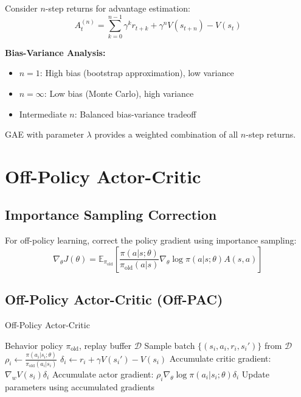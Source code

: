 \begin{examplebox}
Consider $n$-step returns for advantage estimation:
\begin{equation}
A_t^{(n)} = \sum_{k=0}^{n-1} \gamma^k r_{t+k} + \gamma^n V(s_{t+n}) - V(s_t)
\end{equation}

\textbf{Bias-Variance Analysis:}
\begin{itemize}
    \item $n = 1$: High bias (bootstrap approximation), low variance
    \item $n = \infty$: Low bias (Monte Carlo), high variance  
    \item Intermediate $n$: Balanced bias-variance tradeoff
\end{itemize}

GAE with parameter $\lambda$ provides a weighted combination of all $n$-step returns.
\end{examplebox}

\section{Off-Policy Actor-Critic}

\subsection{Importance Sampling Correction}

For off-policy learning, correct the policy gradient using importance sampling:
\begin{equation}
\nabla_\theta J(\theta) = \mathbb{E}_{\pi_{\text{old}}} \left[ \frac{\pi(a|s; \theta)}{\pi_{\text{old}}(a|s)} \nabla_\theta \log \pi(a|s; \theta) A(s,a) \right]
\end{equation}

\subsection{Off-Policy Actor-Critic (Off-PAC)}

\begin{algorithm}
\caption{Off-Policy Actor-Critic}
\begin{algorithmic}
\REQUIRE Behavior policy $\pi_{\text{old}}$, replay buffer $\mathcal{D}$
    \STATE Sample batch $\{(s_i, a_i, r_i, s_i')\}$ from $\mathcal{D}$
        \STATE $\rho_i \leftarrow \frac{\pi(a_i|s_i; \theta)}{\pi_{\text{old}}(a_i|s_i)}$ 
        \STATE $\delta_i \leftarrow r_i + \gamma V(s_i') - V(s_i)$ 
        \STATE Accumulate critic gradient: $\nabla_w V(s_i) \delta_i$
        \STATE Accumulate actor gradient: $\rho_i \nabla_\theta \log \pi(a_i|s_i; \theta) \delta_i$
    \ENDFOR
    \STATE Update parameters using accumulated gradients
\ENDFOR
\end{algorithmic}
\end{algorithm}

